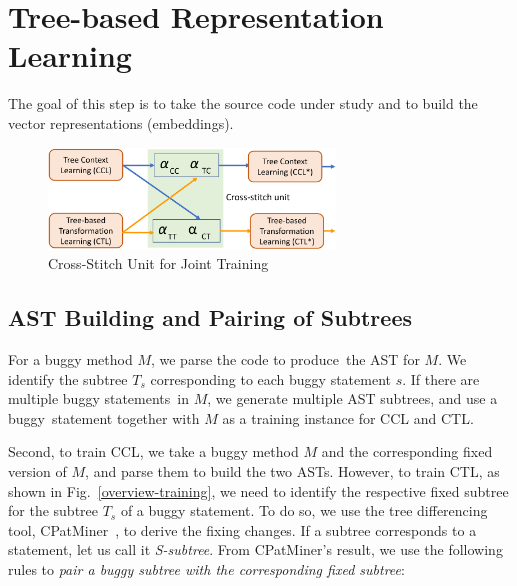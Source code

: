 \section{Tree-based Representation Learning}


The goal of this step is to take the source code under study and to
build the vector representations (embeddings).

\begin{figure}[t]
	\centering
	\includegraphics[width=3in]{graphs/cross-stitch}
        \vspace{-3pt}
	\caption{Cross-Stitch Unit for Joint Training~\cite{misra2016cross}}
	\label{fig:cross-stitch}
\end{figure}


\subsection{AST Building and Pairing of Subtrees}

For a buggy method $M$, we parse the code to produce~the AST for
$M$. We identify the subtree $T_s$ corresponding to each buggy
statement $s$. If there are multiple buggy statements~in $M$, we
generate multiple AST subtrees, and use a buggy~statement
together with $M$ as a training instance for CCL and CTL.

Second, to train CCL, we take a buggy method $M$ and the corresponding
fixed version of $M$, and parse them to build the two ASTs.
%
However, to train CTL, as shown in Fig.~\ref{overview-training}, we
need to identify the respective fixed subtree for the subtree $T_s$ of
a buggy statement. To do so, we use the tree differencing tool,
CPatMiner~\cite{nguyen2019graph}, to derive the fixing changes. If a
subtree corresponds to a statement, let us call it {\em
  S-subtree}. From CPatMiner's result, we use the following rules to
{\em pair a buggy subtree with the corresponding fixed subtree}:

